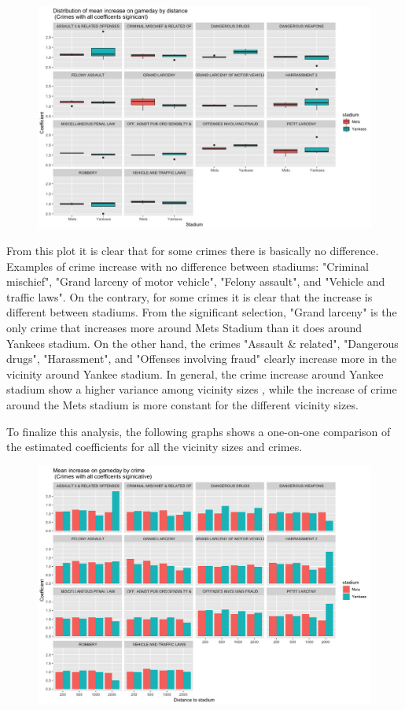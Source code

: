 \documentclass{article}
\begin{document}
\begin{figure}[H]
\centering
\includegraphics[scale=0.45]{box_plot_means.jpeg}
\end{figure}

From this plot  it is clear that for some crimes there is basically no  difference. Examples of crime increase with no difference between stadiums: "Criminal mischief", "Grand larceny of motor vehicle", "Felony assault", and "Vehicle and traffic laws". On the contrary, for some crimes it is clear that the increase is different between stadiums. From the significant selection, "Grand larceny" is the only crime that increases more around Mets Stadium than it does around Yankees stadium. On the other hand, the crimes "Assault \& related", "Dangerous drugs", "Harassment", and "Offenses involving fraud" clearly increase more in the vicinity around Yankee stadium.  In general, the crime increase around Yankee stadium show a higher variance among vicinity sizes , while the increase of crime around the Mets stadium  is more constant for the different vicinity sizes.

To finalize this analysis, the following graphs shows a one-on-one comparison of the estimated coefficients for all the vicinity sizes and crimes. 

\begin{figure}[H]
\centering
\includegraphics[scale=0.45]{mean_increase.png}
\end{figure}
\end{document}
